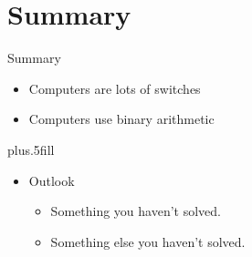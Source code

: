 \documentclass{beamer}
\begin{document}
\section{Summary}

\begin{frame}{Summary}

  \begin{itemize}
  \item
    Computers are \alert{lots of switches}
  \item
    Computers use \alert{binary arithmetic}
  \end{itemize}
  
  \vskip0pt plus.5fill
  \begin{itemize}
  \item
    Outlook
    \begin{itemize}
    \item
      Something you haven't solved.
    \item
      Something else you haven't solved.
    \end{itemize}
  \end{itemize}
\end{frame}
\end{document}
